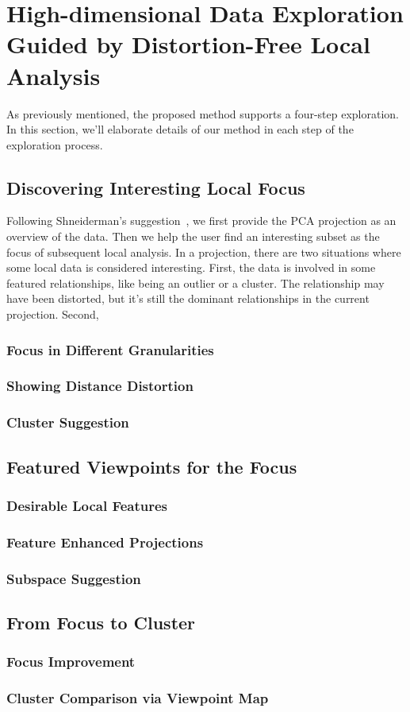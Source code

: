 \section{High-dimensional Data Exploration Guided by Distortion-Free Local Analysis}
As previously mentioned, the proposed method supports a four-step exploration. In this section, we'll elaborate details of our method in each step of the exploration process.
\label{section:method}
\subsection{Discovering Interesting Local Focus}
Following Shneiderman's suggestion~\cite{DBLP:conf/vl/Shneiderman96}, we first provide the PCA projection as an overview of the data. Then we help the user find an interesting subset as the focus of subsequent local analysis. In a projection, there are two situations where some local data is considered interesting. First, the data is involved in some featured relationships, like being an outlier or a cluster. The relationship may have been distorted, but it's still the dominant relationships in the current projection. Second,
\subsubsection{Focus in Different Granularities}
\subsubsection{Showing Distance Distortion}
\subsubsection{Cluster Suggestion}
\subsection{Featured Viewpoints for the Focus}
\subsubsection{Desirable Local Features}
\subsubsection{Feature Enhanced Projections}
\subsubsection{Subspace Suggestion}
\subsection{From Focus to Cluster}
\subsubsection{Focus Improvement}
\subsubsection{Cluster Comparison via Viewpoint Map}
